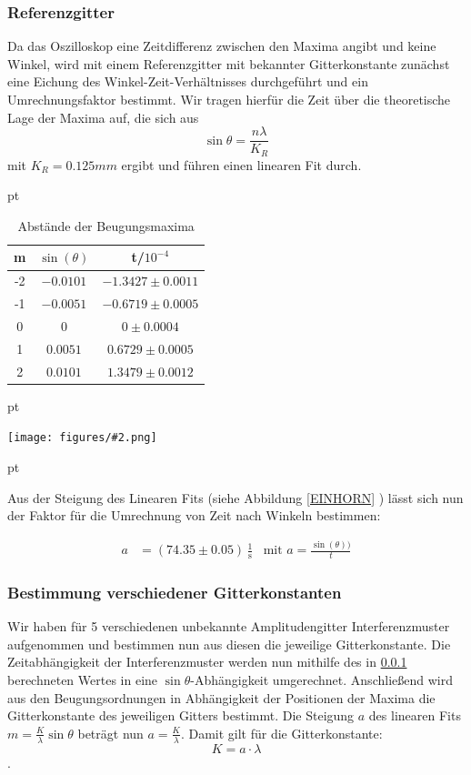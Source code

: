 \documentclass[12pt]{article}
\newcommand{\gra}[3][0.7]{
	\begin{minipage}[h!]{\textwidth}
		\centering
		\texttt{[image: figures/\#2.png]}
		\captionof{figure}{#3}
	\end{minipage}
	\vskip 30 pt
}
\begin{document}
\subsubsection{Referenzgitter}

\label{Happyisttoll}

Da das Oszilloskop eine Zeitdifferenz zwischen den Maxima angibt und keine Winkel, wird mit einem Referenzgitter mit bekannter Gitterkonstante zunächst eine Eichung des Winkel-Zeit-Verhältnisses durchgeführt und ein Umrechnungsfaktor bestimmt. Wir tragen hierfür die Zeit über die theoretische Lage der Maxima auf, die sich aus \[\sin\theta=\frac{n\lambda}{K_R}\] mit $K_R = 0.125 mm$ ergibt und führen einen linearen Fit durch.

 pt
 \begin{table}[h!]
 {\centering{}
\begin{tabular}{c||c|c}
 m & $\sin(\theta)$ & t/$10^{-4}$ \\ \hline\hline
 -2 &$-0.0101$&    $ -1.3427 \pm 0.0011 $  \\ \hline
 -1 &$-0.0051$& $ -0.6719 \pm 0.0005 $     \\ \hline
 0 &$0$&  $ 0\pm 0.0004$         \\ \hline
 1 &$0.0051$&   $ 0.6729 \pm 0.0005 $        \\ \hline
 2 &$0.0101$&     $ 1.3479 \pm 0.0012 $        \\ \hline

 \end{tabular}
 
 \caption{Abstände der Beugungsmaxima}}
\end{table}
 pt

\gra{Zeiteichung}{Zeit-Winkel-Eichung\label{EINHORN}}

Aus der Steigung des Linearen Fits (siehe Abbildung \ref{EINHORN} ) lässt sich nun der Faktor für die Umrechnung von Zeit nach Winkeln bestimmen:

\begin{align*}
a &= (74.35\pm0.05)\,\frac1{\mathrm{s}}&
\text{mit } a = \frac{\sin(\theta))}{t}
\end{align*}

\subsubsection{Bestimmung verschiedener Gitterkonstanten}\label{amplitudengitterkonstante}
Wir haben für 5 verschiedenen unbekannte Amplitudengitter Interferenzmuster aufgenommen und bestimmen nun aus diesen die jeweilige Gitterkonstante. Die Zeitabhängigkeit der Interferenzmuster werden nun mithilfe des in \ref{Happyisttoll} berechneten Wertes in eine $\sin\theta$-Abhängigkeit umgerechnet. Anschließend wird aus den Beugungsordnungen in Abhängigkeit der Positionen der Maxima die Gitterkonstante des jeweiligen Gitters bestimmt. Die Steigung $a$ des linearen Fits $m=\frac{K}{\lambda}\sin\theta$ beträgt nun $a=\frac{K}{\lambda}$. Damit gilt für die Gitterkonstante: $$K=a\cdot\lambda$$.
\end{document}
